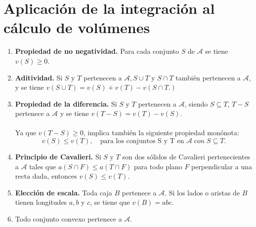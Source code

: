 \begin{enumerate}[ \bfseries 1.]
\end{enumerate}

\section{Aplicación de la integración al cálculo de volúmenes}
\begin{tcolorbox}
    \begin{enumerate}[\bfseries 1.]

	\item \textbf{Propiedad de no negatividad.} Para cada conjunto $S$ de $\mathscr{A}$ se tiene $v(S)\geq 0$.

	\item \textbf{Aditividad.} Si $S$ y $T$ pertenecen a $\mathscr{A}, S\cup T$ y  $S\cap T$ también pertenecen a $\mathscr{A}$, y se tiene $v(S\cup T) = v(S) + v(T) - v(S\cap T.)$

	\item \textbf{Propiedad de la diferencia.} Si $S$ y $T$ pertenecen a  $\mathscr{A}$, siendo $S\subseteq T$, $T-S$ pertenece a $\mathscr{A}$ y se tiene $v(T-S)=v(T)-v(S)$.\\\\
	    Ya que $v(T-S)\geq 0$, implica también la siguiente propiedad monónota:
	    $$v(S)\leq v(T), \quad \mbox{para los conjuntos S y T en } \mathscr{A} \; con \; S\subseteq T.$$

	\item \textbf{Principio de Cavalieri.}  Si $S$ y $T$ son dos sólidos de Cavalieri pertenecientes a $\mathscr{A}$ tales que $a(S\cap F)\leq a(T\cap F)$ para todo plano $F$ perpendicular a una recta dada, entonces $v(S)\leq v(T)$.

	\item \textbf{Elección de escala.} Toda caja $B$ pertenece a $\mathscr{A}$. Si los lados o aristas de $B$ tienen longitudes $a,b$ y $c$, se tiene que $v(B)=abc$.

	\item Todo conjunto convexo pertenece a $\mathscr{A}$. 

    \end{enumerate}
\end{tcolorbox}

